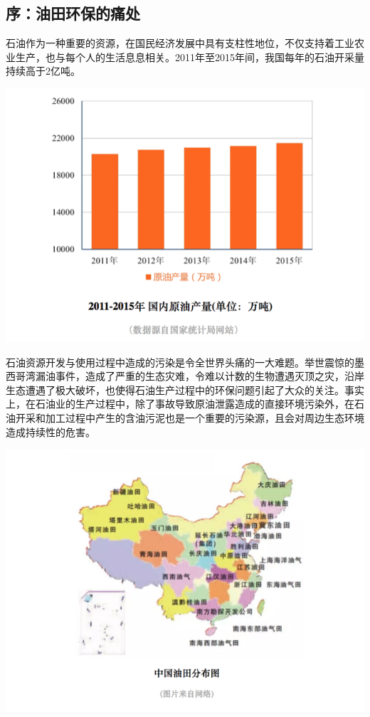 \documentclass[
]{book}
\begin{document}
\hypertarget{ux5e8fux6cb9ux7530ux73afux4fddux7684ux75dbux5904}{%
\subsection{序：油田环保的痛处}\label{ux5e8fux6cb9ux7530ux73afux4fddux7684ux75dbux5904}}

石油作为一种重要的资源，在国民经济发展中具有支柱性地位，不仅支持着工业农业生产，也与每个人的生活息息相关。2011年至2015年间，我国每年的石油开采量持续高于2亿吨。

\includegraphics[width=8.33in]{images/youni1}

石油资源开发与使用过程中造成的污染是令全世界头痛的一大难题。举世震惊的墨西哥湾漏油事件，造成了严重的生态灾难，令难以计数的生物遭遇灭顶之灾，沿岸生态遭遇了极大破坏，也使得石油生产过程中的环保问题引起了大众的关注。事实上，在石油业的生产过程中，除了事故导致原油泄露造成的直接环境污染外，在石油开采和加工过程中产生的含油污泥也是一个重要的污染源，且会对周边生态环境造成持续性的危害。

\includegraphics[width=8.33in]{images/youni2}
\end{document}
